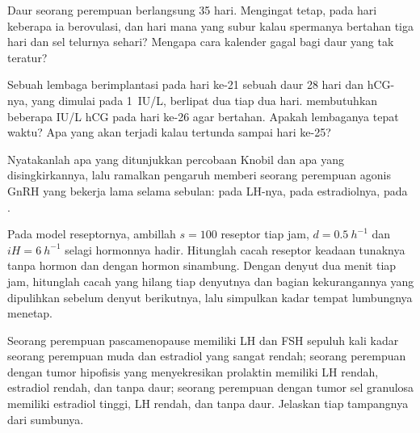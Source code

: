 \begin{exercise}[$\star\star$]\label{exo:b2:reproductive-hormones:7}
Daur seorang perempuan berlangsung 35 hari. Mengingat 
tetap, pada hari keberapa ia berovulasi, dan hari mana yang subur kalau
spermanya bertahan tiga hari dan sel telurnya sehari? Mengapa cara
kalender gagal bagi daur yang tak teratur?
\end{exercise}

\begin{exercise}[$\star\star$]\label{exo:b2:reproductive-hormones:8}
Sebuah lembaga berimplantasi pada hari ke-21 sebuah daur 28 hari dan
hCG-nya, yang dimulai pada \qty{1}{IU/L}, berlipat dua tiap dua hari.
 membutuhkan beberapa IU/L hCG pada hari ke-26 agar
bertahan. Apakah lembaganya tepat waktu? Apa yang akan terjadi kalau
 tertunda sampai hari ke-25?
\end{exercise}

\begin{exercise}[$\star\star$]\label{exo:b2:reproductive-hormones:9}
Nyatakanlah apa yang ditunjukkan percobaan Knobil dan apa yang
disingkirkannya, lalu ramalkan pengaruh memberi seorang perempuan
agonis GnRH yang bekerja lama selama sebulan: pada LH-nya, pada
estradiolnya, pada .
\end{exercise}

\begin{exercise}[$\star\star\star$]\label{exo:b2:reproductive-hormones:10}
Pada model reseptornya, ambillah $s = 100$ reseptor tiap jam, $d =
\qty{0.5}{h^{-1}}$ dan $iH = \qty{6}{h^{-1}}$ selagi hormonnya hadir.
Hitunglah cacah reseptor keadaan tunaknya tanpa hormon dan dengan
hormon sinambung. Dengan denyut dua menit tiap jam, hitunglah cacah
yang hilang tiap denyutnya dan bagian kekurangannya yang dipulihkan
sebelum denyut berikutnya, lalu simpulkan kadar tempat lumbungnya
menetap.
\end{exercise}

\begin{exercise}[$\star\star\star$]\label{exo:b2:reproductive-hormones:11}
Seorang perempuan pascamenopause memiliki LH dan FSH sepuluh kali kadar
seorang perempuan muda dan estradiol yang sangat rendah; seorang
perempuan dengan tumor hipofisis yang menyekresikan prolaktin memiliki
LH rendah, estradiol rendah, dan tanpa daur; seorang perempuan dengan
tumor sel granulosa memiliki estradiol tinggi, LH rendah, dan tanpa
daur. Jelaskan tiap tampangnya dari sumbunya.
\end{exercise}

